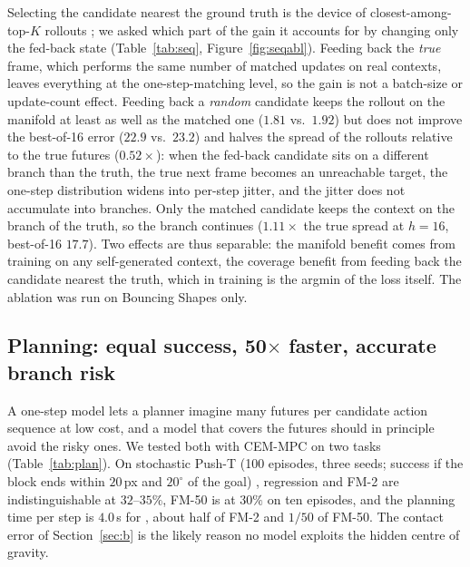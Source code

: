 Selecting the candidate nearest the ground truth is the device of closest-among-top-$K$ rollouts \citep{zhang2025catk}; we asked which part of the gain it accounts for by changing only the fed-back state (Table~\ref{tab:seq}, Figure~\ref{fig:seqabl}). Feeding back the \emph{true} frame, which performs the same number of matched updates on real contexts, leaves everything at the one-step-matching level, so the gain is not a batch-size or update-count effect. Feeding back a \emph{random} candidate keeps the rollout on the manifold at least as well as the matched one ($1.81$ vs.\ $1.92$) but does not improve the best-of-16 error ($22.9$ vs.\ $23.2$) and halves the spread of the rollouts relative to the true futures ($0.52\times$): when the fed-back candidate sits on a different branch than the truth, the true next frame becomes an unreachable target, the one-step distribution widens into per-step jitter, and the jitter does not accumulate into branches. Only the matched candidate keeps the context on the branch of the truth, so the branch continues ($1.11\times$ the true spread at $h{=}16$, best-of-16 $17.7$). Two effects are thus separable: the manifold benefit comes from training on any self-generated context, the coverage benefit from feeding back the candidate nearest the truth, which in \nom{} training is the argmin of the loss itself. The ablation was run on Bouncing Shapes only.

\subsection{Planning: equal success, 50$\times$ faster, accurate branch risk}
\label{sec:planning}
A one-step model lets a planner imagine many futures per candidate action sequence at low cost, and a model that covers the futures should in principle avoid the risky ones. We tested both with CEM-MPC on two tasks (Table~\ref{tab:plan}). On stochastic Push-T (100 episodes, three seeds; success if the block ends within $20$\,px and $20^\circ$ of the goal) \imlewm{}, regression and FM-2 are indistinguishable at $32$--$35\%$, FM-50 is at $30\%$ on ten episodes, and the planning time per step is $4.0$\,s for \imlewm{}, about half of FM-2 and $1/50$ of FM-50. The contact error of Section~\ref{sec:b} is the likely reason no model exploits the hidden centre of gravity.

